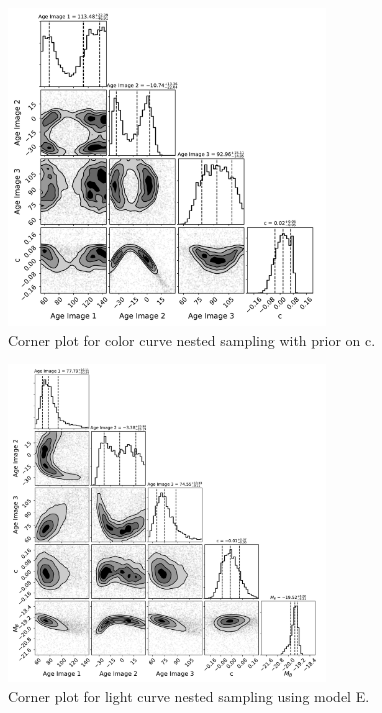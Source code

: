 \documentclass[12pt,dvipsnames]{article}
\begin{document}
\begin{figure}
    \centering
    \includegraphics[width=0.75\textwidth]{Images/corner_color_curve_fit_with_c_prior.pdf}
    \caption{Corner plot for color curve nested sampling with prior on c.}
    \label{fig:corner_cfit}
\end{figure}
\begin{figure}
    \centering
    \includegraphics[width=0.75\textwidth]{Images/corner_model_E.pdf}
    \caption{Corner plot for light curve nested sampling using model E.}
    \label{fig:corner_modelE}
\end{figure}
\end{document}

